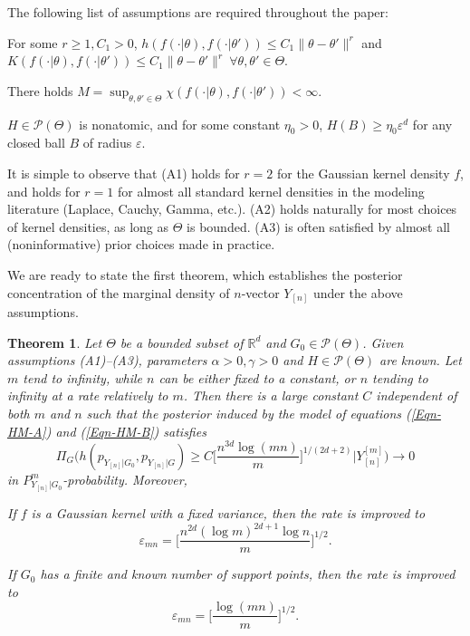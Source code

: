 \documentclass[MSNbibl,number,citesort]{arxbj}
\newcommand{\eqref}[1]{(\ref{#1})}
\newtheorem{theorem}{Theorem}[section]
\newcommand{\real}{\mathbb{R}}
\newcommand{\Pcal}{\mathscr{P}}
\newcommand{\PGz}{P_{Y_{[n]}|G_0}}
\newcommand{\YYn}{Y_{[n]}}
\newcommand{\epsmn}{\varepsilon_{mn}}
\begin{document}
The following list of assumptions are required throughout the paper:
%
\begin{longlist}[(A1)]
%
\item[(A1)] For some $r\geq1, C_1 > 0$,
$h(f(\cdot|\theta), f(\cdot|\theta')) \leq C_1\|\theta-\theta'\|^{r}$
and
$K(f(\cdot|\theta), f(\cdot|\theta')) \leq C_1\|\theta-\theta'\|^{r}\
\forall\theta, \theta' \in\Theta$.

\item[(A2)] There holds
$M = \sup_{\theta,\theta' \in\Theta} \chi(f(\cdot|\theta
),f(\cdot
|\theta')) < \infty$.

\item[(A3)] $H \in\Pcal(\Theta)$ is nonatomic, and
for some constant $\eta_0 > 0$, $H(B) \geq\eta_0 \varepsilon^d$ for
any closed ball $B$ of radius $\varepsilon$.
\end{longlist}
%
It is simple to observe that
(A1) holds for $r=2$ for the Gaussian kernel density $f$,
and holds for $r=1$ for almost all standard kernel densities in the
modeling literature (Laplace, Cauchy, Gamma, etc.).
(A2) holds naturally for most choices of kernel densities, as long as
$\Theta$ is bounded. (A3) is often satisfied by
almost all (noninformative) prior choices made in practice.

We are ready to state the first theorem, which
establishes the posterior concentration of the
marginal density of $n$-vector $\YYn$ under the above assumptions.

%
\begin{theorem}
\label{Thm-main-0}
Let $\Theta$ be a bounded subset of $\real^d$ and
$G_0 \in\Pcal(\Theta)$. Given assumptions \textup{(A1)--(A3)},
parameters $\alpha> 0, \gamma> 0$ and $H \in\Pcal(\Theta)$ are known.
Let $m$ tend to infinity, while $n$ can be either fixed to a constant,
or $n$ tending to infinity at a rate relatively to $m$.
Then there is a large constant $C$ independent of both $m$ and $n$ such that
the posterior induced by the model of equations \eqref{Eqn-HM-A}
and \eqref{Eqn-HM-B}
satisfies
%
\[
\Pi_G \biggl(h({p_{Y_{[n]}|G_0}},
{p_{Y_{[n]}|G}}) \geq C \biggl[\frac{n^{3d}\log(mn)}{m} \biggr]^{1/(2d+2)} \Big|
\YYn^{[m]} \biggr) \longrightarrow0
\]
%
in $\PGz^m$-probability. Moreover,
%
\begin{longlist}[(ii)]
%
\item[(i)] If $f$ is a Gaussian kernel with a fixed variance, then the
rate is improved to
%
\[
\epsmn= \biggl[\frac{n^{2d}(\log m)^{2d+1}\log n}{m} \biggr]^{1/2}.
\]
%
\item[(ii)] If $G_0$ has a finite \emph{and} known number of support points,
then the rate is improved to
%
\[
\epsmn= \biggl[\frac{\log(mn)}{m} \biggr]^{1/2}.
\]
%
\end{longlist}
%
\end{theorem}
\end{document}
